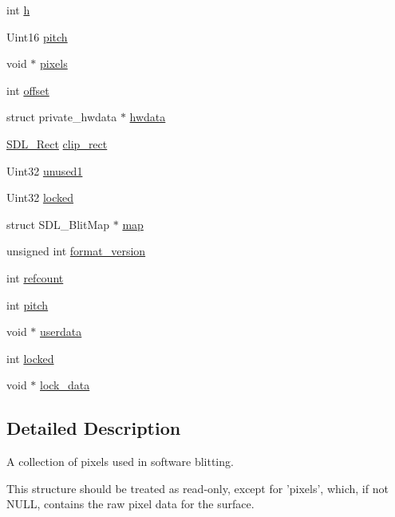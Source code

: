 \begin{DoxyCompactItemize}
\item 
int \hyperlink{structSDL__Surface_af33bcf87a1f5e10a99b3c7e8626b38c8}{h}
\item 
Uint16 \hyperlink{structSDL__Surface_a5fa37325d77d65b2ed64ffc7cd01bb6c}{pitch}
\item 
void $\ast$ \hyperlink{structSDL__Surface_ada4bbb4e87ef8c52fb5b234ce45b3978}{pixels}
\item 
int \hyperlink{structSDL__Surface_ab40c060fa976dbb25bebc7869132ffda}{offset}
\item 
struct private\+\_\+hwdata $\ast$ \hyperlink{structSDL__Surface_a2d3ce688b6cfb72875f2411ea0560f18}{hwdata}
\item 
\hyperlink{structSDL__Rect}{S\+D\+L\+\_\+\+Rect} \hyperlink{structSDL__Surface_aa9a0da3b38261dad6cf0cc4e3bb5b0c3}{clip\+\_\+rect}
\item 
Uint32 \hyperlink{structSDL__Surface_a41066cf7cc91d2f032dd0f29cc418ec4}{unused1}
\item 
Uint32 \hyperlink{structSDL__Surface_a5022edaeea1c0a055fa5d6dccba41de2}{locked}
\item 
struct S\+D\+L\+\_\+\+Blit\+Map $\ast$ \hyperlink{structSDL__Surface_ae6fcc0962eb9a59b4c795fe8e3bd49ad}{map}
\item 
unsigned int \hyperlink{structSDL__Surface_a71e84e52b2faf69be9739f97b248342a}{format\+\_\+version}
\item 
int \hyperlink{structSDL__Surface_a03d10628a359c0674f5ceffd574f1641}{refcount}
\item 
int \hyperlink{structSDL__Surface_a5fa37325d77d65b2ed64ffc7cd01bb6c}{pitch}
\item 
void $\ast$ \hyperlink{structSDL__Surface_a2716a62d5f26e233e2835e002491821b}{userdata}
\item 
int \hyperlink{structSDL__Surface_a5022edaeea1c0a055fa5d6dccba41de2}{locked}
\item 
void $\ast$ \hyperlink{structSDL__Surface_a32de076726e96dafd4da1fd4f75cc2a8}{lock\+\_\+data}
\end{DoxyCompactItemize}


\subsection{Detailed Description}
A collection of pixels used in software blitting. 

This structure should be treated as read-\/only, except for 'pixels', which, if not N\+U\+L\+L, contains the raw pixel data for the surface.

